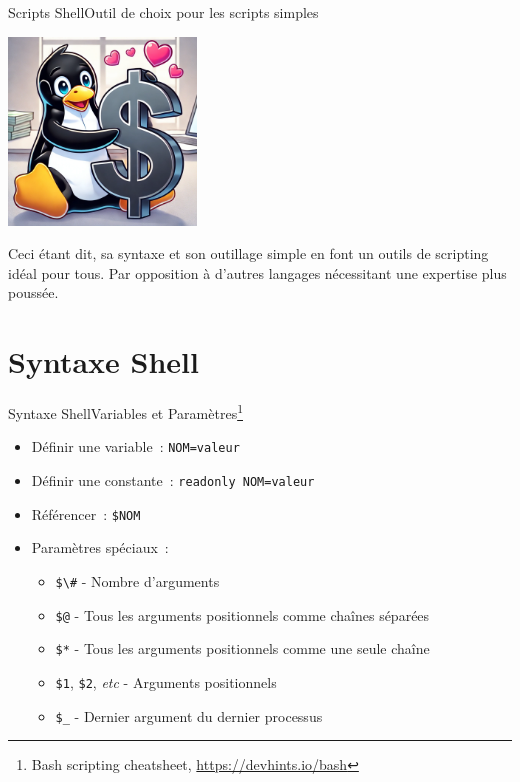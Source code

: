 \documentclass{beamer}
\begin{document}
    \begin{frame}{Scripts Shell}{Outil de choix pour les scripts simples}
        \begin{center}
            \includegraphics[width=5cm]{image/pinguin-hugging-shell}
        \end{center}
        Ceci étant dit, sa syntaxe et son outillage simple en font un outils de scripting idéal pour tous.
        Par opposition à d'autres langages nécessitant une expertise plus poussée.
    \end{frame}


    \section{Syntaxe Shell}\label{sec:syntaxe-shell}

    \begin{frame}{Syntaxe Shell}{Variables et Paramètres\footnote{\label{devhint-bash}Bash scripting cheatsheet, \url{https://devhints.io/bash}}}
        \bigbreak
        \begin{itemize}
            \item Définir une variable~: \lstinline{NOM=valeur}
            \item Définir une constante~: \lstinline{readonly NOM=valeur}
            \item Référencer~: \lstinline{$NOM}
            \item Paramètres spéciaux~:
            \begin{itemize}
                \item \lstinline{$\#} - Nombre d'arguments
                \item \lstinline{$@} - Tous les arguments positionnels comme chaînes séparées
                \item \lstinline{$*} - Tous les arguments positionnels comme une seule chaîne
                \item \lstinline{$1}, \lstinline{$2}, \textit{etc} - Arguments positionnels
                \item \lstinline{$_} - Dernier argument du dernier processus
            \end{itemize}
        \end{itemize}
    \end{frame}
\end{document}
